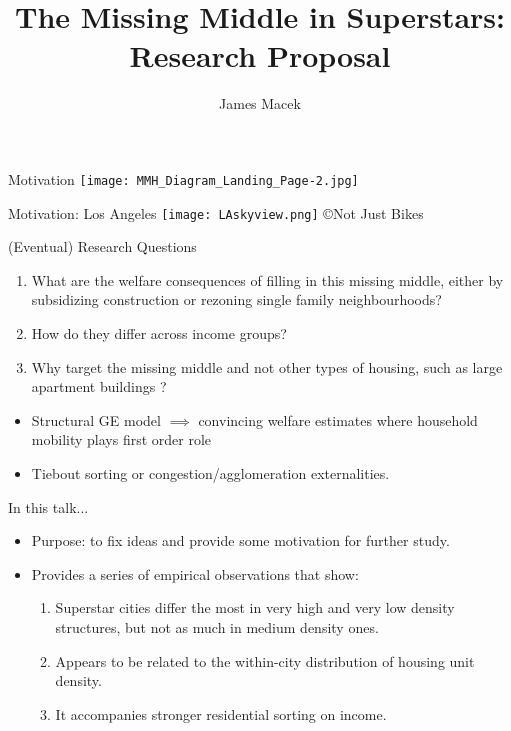 \documentclass{beamer}
\title{The Missing Middle in Superstars: Research Proposal}
\author{James Macek}
\theoremstyle{plain}
\begin{document}
\begin{frame}[plain]
	\maketitle
\end{frame}

\begin{frame}{Motivation}
\texttt{[image: MMH\_Diagram\_Landing\_Page-2.jpg]}
\end{frame}

\begin{frame}{Motivation: Los Angeles}
\texttt{[image: LAskyview.png]}
\copyright Not Just Bikes
\end{frame}

\begin{frame}{(Eventual) Research Questions}
\begin{enumerate}
	\itemsep1em
 	\item What are the welfare consequences of filling in this missing middle, either by subsidizing construction or rezoning single family neighbourhoods? \pause
 	\item How do they differ across income groups? \pause
 	\item Why target the missing middle and not other types of housing, such as large apartment buildings \citep{asquithetallocaleffects}?
\end{enumerate}
\begin{itemize}
	\item Structural GE model $\implies$ convincing welfare estimates where household mobility plays first order role
	\item Tiebout sorting or congestion/agglomeration externalities.
\end{itemize}
\end{frame}

\begin{frame}{In this talk...} 
\begin{itemize}
	\itemsep1em
	\item Purpose: to fix ideas and provide some motivation for further study. \pause 
	\item Provides a series of empirical observations that show:
	\begin{enumerate}
		\itemsep1em
		\color{black}
		\item Superstar cities differ the most in very high and very low density structures, but not as much in medium density ones. \pause
		\item Appears to be related to the within-city distribution of housing unit density. \pause
		\item It accompanies stronger residential sorting on income. 
	\end{enumerate}
\end{itemize}
\end{frame}
\end{document}
